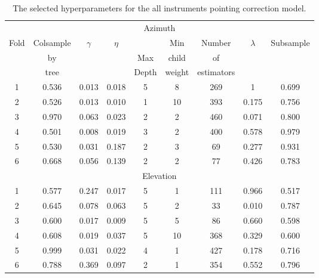 \begin{table}[!htbp]
    \centering
    \caption{The selected hyperparameters for the all instruments pointing correction model.}
    \begin{tabular}{ccccccccc}
        \toprule
        \multicolumn{9}{c}{Azimuth} \\
        \multirow{3}{*}{Fold} &  Colsample &  \multirow{3}{*}{$\gamma$} &  \multirow{3}{*}{$\eta$} &   &  Min &  Number &  \multirow{3}{*}{$\lambda$} &  \multirow{3}{*}{Subsample} \\
         & by   & & & Max   & child  & of         & & \\
         & tree & & & Depth & weight & estimators & & \\
        \midrule
        1 &   0.536 &  0.013 &          0.018 &      5 &             8 &       269 &       1 &      0.699 \\
        2 &   0.526 &  0.013 &          0.010 &      1 &            10 &       393 &       0.175 &      0.756 \\
        3 &   0.970 &  0.063 &          0.023 &      2 &             2 &       460 &       0.071 &      0.800 \\
        4 &   0.501 &  0.008 &          0.019 &      3 &             2 &       400 &       0.578 &      0.979 \\
        5 &   0.530 &  0.031 &          0.187 &      2 &             3 &        69 &       0.277 &      0.931 \\
        6 &   0.668 &  0.056 &          0.139 &      2 &             2 &        77 &       0.426 &      0.783 \\
        \cmidrule{1-9}
        \multicolumn{9}{c}{Elevation} \\
        \cmidrule{1-9}
        1 &   0.577 &  0.247 &          0.017 &      5 &             1 &       111 &       0.966 &      0.517 \\
        2 &   0.645 &  0.078 &          0.063 &      5 &             2 &        33 &       0.010 &      0.787 \\
        3 &   0.600 &  0.017 &          0.009 &      5 &             5 &        86 &       0.660 &      0.598 \\
        4 &   0.608 &  0.019 &          0.037 &      5 &            10 &       368 &       0.329 &      0.600 \\
        5 &   0.999 &  0.031 &          0.022 &      4 &             1 &       427 &       0.178 &      0.716 \\
        6 &   0.788 &  0.369 &          0.097 &      2 &             1 &       354 &       0.552 &      0.796 \\
        \bottomrule
        \end{tabular}
\end{table}

